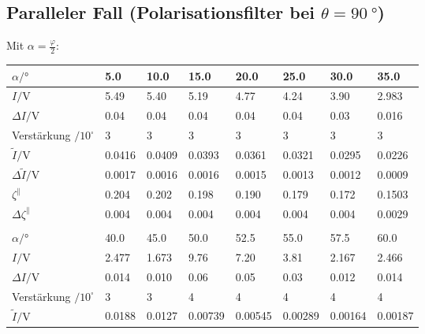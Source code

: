 	\subsection{Paralleler Fall (Polarisationsfilter bei $\theta = \SI{90}{\degree}$)}
		Mit $\alpha = \frac{\varphi}{2}$:
		\begin{center}
			\begin{tabular}{@{} l  *{7}{l} @{}}
				\toprule
				$\alpha/\si{\degree}$        & \num{5.0} & \num{10.0} & \num{15.0} & \num{20.0} & \num{25.0} & \num{30.0} & \num{35.0} \\
				\midrule
				$I/\si{\volt}$               & \num{5.49} & \num{5.40} & \num{5.19} & \num{4.77} & \num{4.24} & \num{3.90} & \num{2.983} \\
				$\Delta I/\si{\volt}$        & \num{0.04} & \num{0.04} & \num{0.04} & \num{0.04} & \num{0.04} & \num{0.03} & \num{0.016} \\
				Verstärkung $/10^\square$    & \num{3} & \num{3} & \num{3} & \num{3} & \num{3} & \num{3} & \num{3} \\
				$\tilde{I}/\si{\volt}$       & \num{0.0416} & \num{0.0409} & \num{0.0393} & \num{0.0361} & \num{0.0321} & \num{0.0295} & \num{0.0226} \\
				$\Delta\tilde{I}/\si{\volt}$ & \num{0.0017} & \num{0.0016} & \num{0.0016} & \num{0.0015} & \num{0.0013} & \num{0.0012} & \num{0.0009} \\
				\midrule
				$\zeta^{\parallel}$          & \num{0.204} & \num{0.202} & \num{0.198} & \num{0.190} & \num{0.179} & \num{0.172} & \num{0.1503} \\
				$\Delta\zeta^{\parallel}$    & \num{0.004} & \num{0.004} & \num{0.004} & \num{0.004} & \num{0.004} & \num{0.004} & \num{0.0029} \\
				\bottomrule
				\\[-0.5em]
				\toprule
				$\alpha/\si{\degree}$        & \num{40.0} & \num{45.0} & \num{50.0} & \num{52.5} & \num{55.0} & \num{57.5} & \num{60.0} \\
				\midrule
				$I/\si{\volt}$               & \num{2.477} & \num{1.673} & \num{9.76} & \num{7.20} & \num{3.81} & \num{2.167} & \num{2.466} \\
				$\Delta I/\si{\volt}$        & \num{0.014} & \num{0.010} & \num{0.06} & \num{0.05} & \num{0.03} & \num{0.012} & \num{0.014} \\
				Verstärkung $/10^\square$    & \num{3} & \num{3} & \num{4} & \num{4} & \num{4} & \num{4} & \num{4} \\
				$\tilde{I}/\si{\volt}$       & \num{0.0188} & \num{0.0127} & \num{0.00739} & \num{0.00545} & \num{0.00289} & \num{0.00164} & \num{0.00187} \\

\end{tabular}
\end{center}

